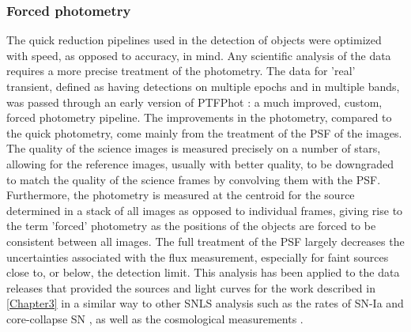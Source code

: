\subsubsection{Forced photometry}
The quick reduction pipelines used in the detection of objects were optimized with speed, as opposed to accuracy, in mind. Any scientific analysis of the data requires a more precise treatment of the photometry. The data for 'real' transient, defined as having detections on multiple epochs and in multiple bands, was passed through an early version of PTFPhot \citep{Firth2015}: a much improved, custom, forced photometry pipeline. The improvements in the photometry, compared to the quick photometry, come mainly from the treatment of the PSF of the images. The quality of the science images is measured precisely on a number of stars, allowing for the reference images, usually with better quality, to be downgraded to match the quality of the science frames by convolving them with the PSF. Furthermore, the photometry is measured at the centroid for the source determined in a stack of all images as opposed to individual frames, giving rise to the term 'forced' photometry as the positions of the objects are forced to be consistent between all images. The full treatment of the PSF largely decreases the uncertainties associated with the flux measurement, especially for faint sources close to, or below, the detection limit. This analysis has been applied to the data releases that provided the sources and light curves for the work described in \cref{Chapter3} in a similar way to other SNLS analysis such as the rates of SN-Ia \citep{Perrett2012} and core-collapse SN \citep{Bazin2009}, as well as the cosmological measurements \citep{Astier2006,Sullivan2011}.
% 
% 

